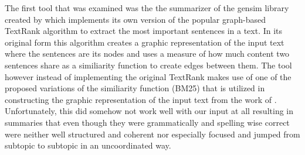 The first tool that was examined was the the summarizer of the gensim library created by \citet{rehurek_lrec} which implements its own version of the popular graph-based TextRank algorithm to extract the most important sentences in a text. In its original form this algorithm creates a graphic representation of the input text where the sentences are its nodes and uses a measure of how much content two sentences share as a similiarity function to create edges between them. The tool however instead of implementing the original TextRank makes use of one of the proposed variations of the similiarity function (BM25) that is utilized in constructing the graphic representation of the input text from the work of \citet{DBLP:journals/corr/BarriosLAW16}. Unfortunately, this did somehow not work well with our input at all resulting in summaries that even though they were grammatically and spelling wise correct were neither well structured and coherent nor especially focused and jumped from subtopic to subtopic in an uncoordinated way.  

